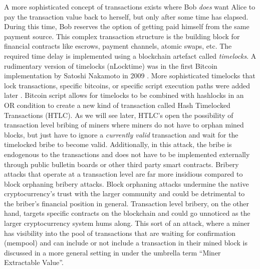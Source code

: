 \documentclass[runningheads]{llncs}
\begin{document}
A more sophisticated concept of transactions exists where Bob \emph{does} want Alice to pay the transaction value back to herself, but only after some time has elapsed. During this time, Bob reserves the option of getting paid himself from the same payment source. This complex transaction structure is the building block for financial contracts like escrows, payment channels, atomic swaps, etc. The required time delay is implemented using a blockchain artefact called \emph{timelocks}. A rudimentary version of timelocks (nLocktime) was in the first Bitcoin implementation by Satoshi Nakamoto in 2009 \cite{satoshi_bitcoin_release_0_1_0}. More sophisticated timelocks that lock transactions, specific bitcoins, or specific script execution paths were added later \cite{BIP68} \cite{BIP65} \cite{BIP112}. Bitcoin script allows for timelocks to be combined with hashlocks in an OR condition to create a new kind of transaction called Hash Timelocked Transactions (HTLC). As we will see later, HTLC's open the possibility of transaction level bribing of miners where miners do not have to orphan mined blocks, but just have to ignore a \emph{currently valid} transaction and wait for the timelocked bribe to become valid. Additionally, in this attack, the bribe is endogenous to the transactions and does not have to be implemented externally through public bulletin boards or other third party smart contracts. Bribery attacks that operate at a transaction level are far more insidious compared to block orphaning bribery attacks. Block orphaning attacks undermine the native cryptocurrency's trust with the larger community and could be detrimental to the briber's financial position in general. Transaction level bribery, on the other hand, targets specific contracts on the blockchain and could go unnoticed as the larger cryptocurrency system hums along. This sort of an attack, where a miner has visibility into the pool of transactions that are waiting for confirmation (mempool) and can include or not include a transaction in their mined block is discussed in a more general setting in \cite{daian2020flash} under the umbrella term ``Miner Extractable Value''.
\end{document}
